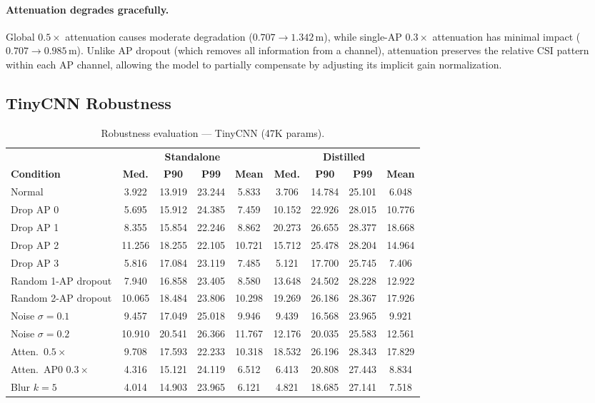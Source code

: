 \documentclass[11pt,a4paper]{article}
\begin{document}
\paragraph{Attenuation degrades gracefully.}
Global $0.5\times$ attenuation causes moderate degradation ($0.707 \to 1.342$\,m), while single-AP $0.3\times$ attenuation has minimal impact ($0.707 \to 0.985$\,m).
Unlike AP dropout (which removes all information from a channel), attenuation preserves the relative CSI pattern within each AP channel, allowing the model to partially compensate by adjusting its implicit gain normalization.


\subsection{TinyCNN Robustness}

\begin{table}[H]
\centering
\caption{Robustness evaluation --- TinyCNN (47K params).}
\label{tab:robust_tinycnn}
\begin{tabular}{@{}lcccc|cccc@{}}
\toprule
 & \multicolumn{4}{c|}{\textbf{Standalone}} & \multicolumn{4}{c}{\textbf{Distilled}} \\
\textbf{Condition} & \textbf{Med.} & \textbf{P90} & \textbf{P99} & \textbf{Mean} & \textbf{Med.} & \textbf{P90} & \textbf{P99} & \textbf{Mean} \\
\midrule
Normal                 & 3.922 & 13.919& 23.244 & 5.833 & 3.706 & 14.784& 25.101 & 6.048 \\
\midrule
Drop AP 0              & 5.695 & 15.912& 24.385 & 7.459 & 10.152& 22.926& 28.015 & 10.776\\
Drop AP 1              & 8.355 & 15.854& 22.246 & 8.862 & 20.273& 26.655& 28.377 & 18.668\\
Drop AP 2              & 11.256& 18.255& 22.105 & 10.721& 15.712& 25.478& 28.204 & 14.964\\
Drop AP 3              & 5.816 & 17.084& 23.119 & 7.485 & 5.121 & 17.700& 25.745 & 7.406 \\
Random 1-AP dropout    & 7.940 & 16.858& 23.405 & 8.580 & 13.648& 24.502& 28.228 & 12.922\\
Random 2-AP dropout    & 10.065& 18.484& 23.806 & 10.298& 19.269& 26.186& 28.367 & 17.926\\
\midrule
Noise $\sigma\!=\!0.1$ & 9.457 & 17.049& 25.018 & 9.946 & 9.439 & 16.568& 23.965 & 9.921 \\
Noise $\sigma\!=\!0.2$ & 10.910& 20.541& 26.366 & 11.767& 12.176& 20.035& 25.583 & 12.561\\
\midrule
Atten.\ $0.5\times$    & 9.708 & 17.593& 22.233 & 10.318& 18.532& 26.196& 28.343 & 17.829\\
Atten.\ AP0 $0.3\times$& 4.316 & 15.121& 24.119 & 6.512 & 6.413 & 20.808& 27.443 & 8.834 \\
Blur $k\!=\!5$         & 4.014 & 14.903& 23.965 & 6.121 & 4.821 & 18.685& 27.141 & 7.518 \\
\bottomrule
\end{tabular}
\end{table}
\end{document}
